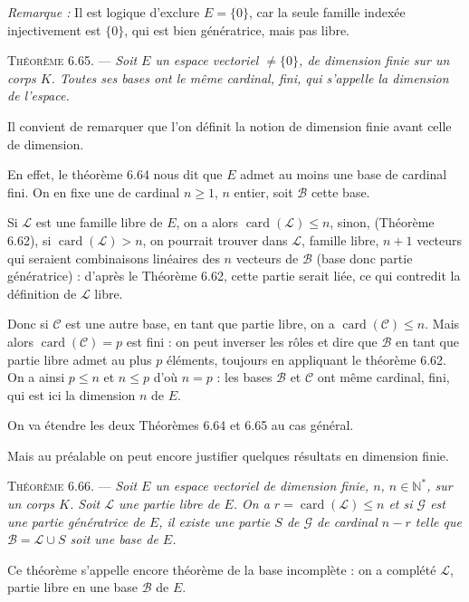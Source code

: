 \emph{Remarque :} Il est logique d'exclure $E=\{0\}$, car la seule famille indexée injectivement est $\{0\}$, qui est bien génératrice, mais pas libre.

\medskip\noindent\textsc{Théorème 6.65.} --- \emph{Soit $E$ un espace vectoriel $\ne\{0\}$, de dimension finie sur un corps $K$. Toutes ses bases ont le même cardinal, fini, qui s'appelle la dimension de l'espace.}

Il convient de remarquer que l'on définit la notion de dimension finie avant celle de dimension.

En effet, le théorème 6.64 nous dit que $E$ admet au moins une base de cardinal fini. On en fixe une de cardinal $n\ge1$, $n$ entier, soit $\mathcal B$ cette base.

Si $\mathcal L$ est une famille libre de $E$, on a alors $\operatorname{card}(\mathcal L)\le n$, sinon, (Théorème 6.62), si $\operatorname{card}(\mathcal L)>n$, on pourrait trouver dans $\mathcal L$, famille libre, $n+1$ vecteurs qui seraient combinaisons linéaires des $n$ vecteurs de $\mathcal B$ (base donc partie génératrice) : d'après le Théorème 6.62, cette partie serait liée, ce qui contredit la définition de $\mathcal L$ libre.

Donc si $\mathcal C$ est une autre base, en tant que partie libre, on a $\operatorname{card}(\mathcal C)\le n$. Mais alors $\operatorname{card}(\mathcal C)=p$ est fini : on peut inverser les rôles et dire que $\mathcal B$ en tant que partie libre admet au plus $p$ éléments, toujours en appliquant le théorème 6.62. On a ainsi $p\le n$ et $n\le p$ d'où $n=p$ : les bases $\mathcal B$ et $\mathcal C$ ont même cardinal, fini, qui est ici la dimension $n$ de $E$. \bookend

On va étendre les deux Théorèmes 6.64 et 6.65 au cas général.

Mais au préalable on peut encore justifier quelques résultats en dimension finie.

\medskip\noindent\textsc{Théorème 6.66.} --- \emph{Soit $E$ un espace vectoriel de dimension finie, $n$, $n\in\mathbb N^*$, sur un corps $K$. Soit $\mathcal L$ une partie libre de $E$. On a $r=\operatorname{card}(\mathcal L)\le n$ et si $\mathcal G$ est une partie génératrice de $E$, il existe une partie $S$ de $\mathcal G$ de cardinal $n-r$ telle que $\mathcal B=\mathcal L\cup S$ soit une base de $E$.}

Ce théorème s'appelle encore théorème de la base incomplète : on a complété $\mathcal L$, partie libre en une base $\mathcal B$ de $E$.

